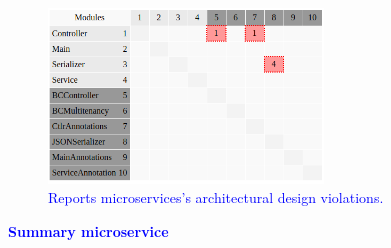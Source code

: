 \documentclass[12pt]{article}
\begin{document}
\begin{figure}[ht]
\centering
\includegraphics[width=0.65\textwidth]{figuras/violacoesReports.png}
\caption{\textcolor{blue}{Reports microservices's architectural design violations.}}
\label{fig:microservices}
\end{figure}

\newpage
\noindent\textbf{\large{\textcolor{blue}{Summary microservice}}}
\label{sec:ApendiceSummary}
\end{document}
